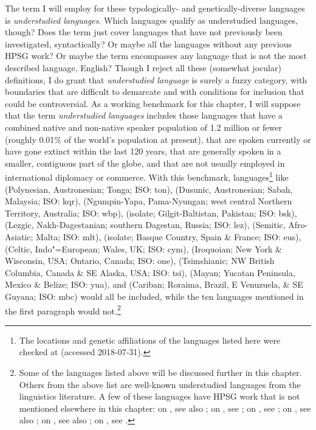 \documentclass[output=paper
                ,modfonts
                ,nonflat
	        ,collection
	        ,collectionchapter
	        ,collectiontoclongg
 	        ,biblatex
                ,babelshorthands
                ,newtxmath
                ,draftmode
                ,colorlinks, citecolor=brown
]{./langsci/langscibook}
\begin{document}
{The term I will employ for these typologically- and genetically-diverse languages is \emph{understudied languages}. Which languages qualify as understudied languages, though? Does the term just cover languages that have not previously been investigated, syntactically? Or maybe all the languages without any previous HPSG work? Or maybe the term encompasses any language that is not the most described language, English? Though I reject all these (somewhat jocular) definitions, I do grant that \textit{understudied language} is surely a fuzzy category, with boundaries that are difficult to demarcate and with conditions for inclusion that could be controversial. As a working benchmark for this chapter, I will suppose that the term \textit{understudied languages} includes those languages that have a combined native and non-native speaker population of 1.2 million or fewer (roughly 0.01\% of the world's population at present), that are spoken currently or have gone extinct within the last 120 years, that are generally spoken in a smaller, contiguous part of the globe, and that are not usually employed in international diplomacy or commerce. With this benchmark, languages\footnote{The locations and genetic affiliations of the languages listed here were checked at \citet{glottolog18} (accessed 2018-07-31).} like
 (Polynesian, Austronesian; Tonga; ISO: ton), 
 (Dusunic, Austronesian; Sabah, Malaysia; ISO: kqr),
 (Ngumpin-Yapa, Pama-Nyungan; west central Northern Territory, Australia; ISO: wbp), 
 (isolate; Gilgit-Baltistan, Pakistan; ISO: bsk), 
 (Lezgic, Nakh-Dagestanian; southern Dagestan, Russia; ISO: lez), 
 (Semitic, Afro-Asiatic; Malta; ISO: mlt), 
 (isolate; Basque Country, Spain \& France; ISO: eus),  
 (Celtic, Indo"=European; Wales, UK; ISO: cym), 
 (Iroquoian; New York \& Wisconsin, USA; Ontario, Canada; ISO: one), 
 (Tsimshianic; NW British Columbia, Canada \& SE Alaska, USA; ISO: tsi),
 (Mayan; Yucatan Peninsula, Mexico \& Belize; ISO: yua), and
 (Cariban; Roraima, Brazil, E Venuzuela, \& SE Guyana; ISO: mbc)
would all be included, while the ten languages mentioned in the first paragraph would not.\footnote{\label{list expln}Some of the languages listed above will be discussed further in this chapter. Others from the above list are well-known understudied languages from the linguistics literature. A few of these languages have HPSG work that is not mentioned elsewhere in this chapter: on , see also \citet{dukes2000}; on , see \citet{donosag99}; on , see \citet{MuellerMalteseSketch}; on , see also \citet{CB11}; on , see also \citet{KM2010a-u}; on , see \citet{dabkowski17}.}   


}
\end{document}
